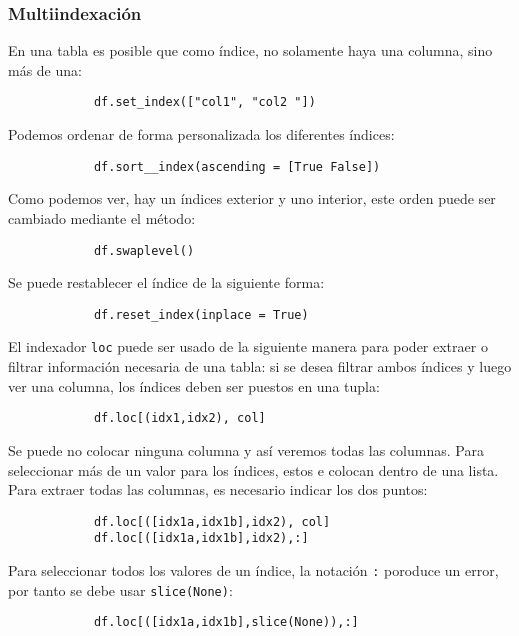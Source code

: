 \subsubsection{Multiindexación}
En una tabla es posible que como índice, no solamente haya una columna, sino
más de una:
\begin{verbatim}
            df.set_index(["col1", "col2 "])
           \end{verbatim}
Podemos ordenar de forma personalizada los diferentes índices:
\begin{verbatim}
            df.sort__index(ascending = [True False])
            \end{verbatim}
Como podemos ver, hay un índices exterior y uno interior, este orden puede ser
cambiado mediante el método:
\begin{verbatim}
            df.swaplevel()
            \end{verbatim}
Se puede restablecer el índice de la siguiente forma:
\begin{verbatim}
            df.reset_index(inplace = True)
            \end{verbatim}
El indexador \texttt{loc} puede ser usado de la siguiente manera para poder
extraer o filtrar información necesaria de una tabla:
si se desea filtrar ambos índices y luego ver una columna, los índices deben
ser puestos en una tupla:
\begin{verbatim}
            df.loc[(idx1,idx2), col]
            \end{verbatim}
Se puede no colocar ninguna columna y así veremos todas las columnas.
Para seleccionar más de un valor para los índices, estos e colocan dentro de
una lista. Para extraer todas las columnas, es necesario indicar los dos
puntos:
\begin{verbatim}
            df.loc[([idx1a,idx1b],idx2), col]
            df.loc[([idx1a,idx1b],idx2),:]
            \end{verbatim}
Para seleccionar todos los valores de un índice, la notación \texttt{:}
poroduce un error, por tanto se debe usar \texttt{slice(None)}:
\begin{verbatim}
            df.loc[([idx1a,idx1b],slice(None)),:]
            \end{verbatim}
